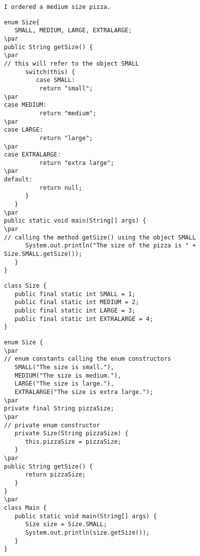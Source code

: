 \documentclass{book}
\def\lthtmlcheckvsize{\ifdim\ht\sizebox<\vsize 
  \ifdim\wd\sizebox<\hsize\expandafter\hfill\fi \expandafter\vfill
  \else\expandafter\vss\fi}%
\begin{document}
{\newpage\clearpage
{}%
\begin{lstlisting}
I ordered a medium size pizza.
\end{lstlisting}%
\lthtmlfigureZ
\lthtmlcheckvsize\clearpage}

{\newpage\clearpage
{}%
\begin{lstlisting}
enum Size{
   SMALL, MEDIUM, LARGE, EXTRALARGE;
\par
public String getSize() {
\par
// this will refer to the object SMALL
      switch(this) {
         case SMALL:
          return "small";
\par
case MEDIUM:
          return "medium";
\par
case LARGE:
          return "large";
\par
case EXTRALARGE:
          return "extra large";
\par
default:
          return null;
      }
   }
\par
public static void main(String[] args) {
\par
// calling the method getSize() using the object SMALL
      System.out.println("The size of the pizza is " + Size.SMALL.getSize());
   }
}
\end{lstlisting}%
\lthtmlfigureZ
\lthtmlcheckvsize\clearpage}

{\newpage\clearpage
{}%
\begin{lstlisting}
class Size {
   public final static int SMALL = 1;
   public final static int MEDIUM = 2;
   public final static int LARGE = 3;
   public final static int EXTRALARGE = 4;
}
\end{lstlisting}%
\lthtmlfigureZ
\lthtmlcheckvsize\clearpage}

{\newpage\clearpage
{}%
\begin{lstlisting}
enum Size {
\par
// enum constants calling the enum constructors 
   SMALL("The size is small."),
   MEDIUM("The size is medium."),
   LARGE("The size is large."),
   EXTRALARGE("The size is extra large.");
\par
private final String pizzaSize;
\par
// private enum constructor
   private Size(String pizzaSize) {
      this.pizzaSize = pizzaSize;
   }
\par
public String getSize() {
      return pizzaSize;
   }
}
\par
class Main {
   public static void main(String[] args) {
      Size size = Size.SMALL;
      System.out.println(size.getSize());
   }
}
\end{lstlisting}%
\lthtmlfigureZ
\lthtmlcheckvsize\clearpage}
\end{document}
